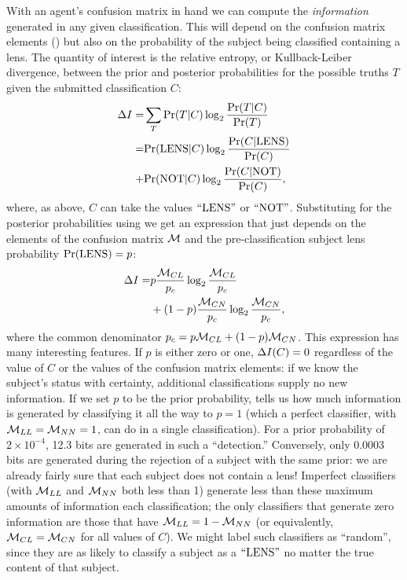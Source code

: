 \documentclass[useAMS,usenatbib,a4paper]{mn2e}
\begin{document}
With an agent's confusion matrix in hand we can compute the
\emph{information} generated in any given classification. This will
depend on the confusion matrix elements () but also on
the probability of the subject being classified containing a lens. The
quantity of interest is the relative entropy, or Kullback-Leiber
divergence, between the prior and
posterior probabilities for the possible truths $T$
given the submitted classification $C$:
\begin{align}
\Delta I =& \sum_T {\rm Pr}(T|C) \log_2 \frac{{\rm Pr}(T|C)}{{\rm Pr}(T)}     \notag \\
             =&    {\rm Pr}({\rm LENS}|C) \log_2 \frac{{\rm Pr}(C|{\rm LENS})}{{\rm Pr}(C)} \notag \\
             +&    {\rm Pr}({\rm NOT}|C)  \log_2 \frac{{\rm Pr}(C|{\rm NOT})}{{\rm Pr}(C)},
\end{align}
where, as above, $C$ can take the values ${\rm ``LENS"}$ or ${\rm ``NOT"}$.
Substituting for the posterior probabilities using  we get
an expression that just depends on the elements of the
confusion matrix $\mathcal{M}$ and the pre-classification subject lens
probability ${\rm Pr}({\rm LENS}) = p$:
\begin{align}
\Delta I =    &     p \frac{\mathcal{M}_{CL}}{p_c} \log_2 \frac{\mathcal{M}_{CL}}{p_c}  \notag \\
                  & +(1-p)\frac{\mathcal{M}_{CN}}{p_c} \log_2 \frac{\mathcal{M}_{CN}}{p_c},
  \label{eq:app:infogain}
\end{align}
where the common denominator $p_c = p\mathcal{M}_{CL} + (1-p)\mathcal{M}_{CN}$. This
expression has many interesting features.  If $p$ is either zero or one,
$\Delta I(C) = 0$  regardless of the value of $C$ or the values of
the confusion matrix elements: if we know the subject's status with
certainty, additional classifications supply no new information. If we
set $p$ to be the prior probability,  tells us how
much information is generated by classifying it all the way to $p = 1$
(which a perfect classifier, with $\mathcal{M}_{LL} = \mathcal{M}_{NN} = 1$, can do in a
single classification). For a prior probability of $2\times 10^{-4}$,
12.3 bits are generated in such a ``detection.''  Conversely, only
0.0003 bits are generated during the rejection of a subject with the
same prior: we are already fairly sure that each subject does not
contain a lens! Imperfect classifiers (with $\mathcal{M}_{LL}$ and $\mathcal{M}_{NN}$
both less than 1)  generate less than these maximum amounts of
information each classification; the only classifiers that generate zero
information are those that have $\mathcal{M}_{LL} = 1 - \mathcal{M}_{NN}$ (or
equivalently, $\mathcal{M}_{CL} = \mathcal{M}_{CN}$ for all values of $C$). We might
label such classifiers as ``random'', since they are as likely to
classify a subject as a ${\rm ``LENS"}$ no matter the true content of that
subject.
\end{document}
